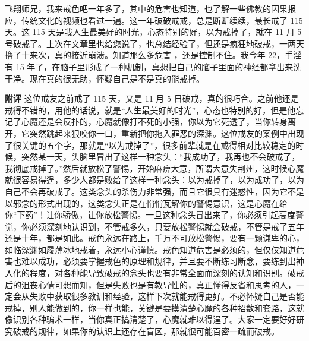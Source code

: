 \begin{case}
    飞翔师兄，我来戒色吧一年多了，其中的危害也知道，也了解一些佛教的因果报应，传统文化的视频也看过一遍。这一年破破戒戒，总是断断续续，最长戒了 115 天。这 115 天是我人生最美好的时光，心态特别的好，以为戒掉了，就在 11 月 5 号破戒了。上次在文章里也给您说了，也总结经验了，但还是疯狂地破戒，一两天撸了十来次，真的接近崩溃。知道那么多危害 ，还是控制不住。我今年 22，手淫有 15 年了，在脑子里形成了一种机制，真想把自己的脑子里面的神经都拿出来洗干净。现在真的很无助，怀疑自己是不是真的能戒掉。

    \textbf{附评} 这位戒友之前戒了 115 天，又是 11 月 5 日破戒，真的很巧合。之前他还是戒得不错的，用他的话说，就是“人生最美好的时光”，心态也特别的好，但是他忘记了心魔还是会反扑的，心魔就像打不死的小强，你以为它死透了，当你转身离开，它突然跳起来狠咬你一口，重新把你拖入罪恶的深渊。这位戒友的案例中出现了很关键的五个字，那就是“以为戒掉了”，很多前辈就是在戒得相对比较稳定的时候，突然某一天，头脑里冒出了这样一种念头：“我成功了，我再也不会破戒了，我彻底戒掉了。”然后就放松了警惕，开始麻痹大意，所谓大意失荆州，这时候心魔就很容易得逞，多少人都是败给了这样一种念头：以为戒掉了，以为成功了，以为自己不会再破戒了。这类念头的杀伤力非常强，而且它很具有迷惑性，因为它不是以邪念的形式出现的，这类念头正是在悄悄瓦解你的警惕意识，这是心魔在给你“下药”！让你骄傲，让你放松警惕。一旦这种念头冒出来了，你必须引起高度警觉，你必须深刻地认识到，不管戒多久，只要放松警惕就会破戒，不管是戒了五年还是十年，都是如此。戒色永远在路上，千万不可放松警惕，要有一颗谦卑的心，如临深渊如履薄冰地戒着，永远小心谨慎。戒色知道危害是必须的，但仅仅知道危害也难以成功，必须要掌握戒色的原理和规律，并且要不断练习断念，要练到出神入化的程度，对各种能导致破戒的念头也要有非常全面而深刻的认知和识别。破戒后的沮丧心情可想而知，但是失败也是有教导性的，真正懂得反省和思考的人，一定会从失败中获取很多教训和经验，这样下次就能戒得更好。不必怀疑自己是否能戒掉，别人能做到的，你一样也能，关键是要摸清楚心魔的各种招数和套路，这就像识别各种骗术一样，当你真正搞清楚了，心魔就难以得逞了。大家一定要好好研究破戒的规律，如果你的认识上还存在盲区，那就很可能百密一疏而破戒。
\end{case}


